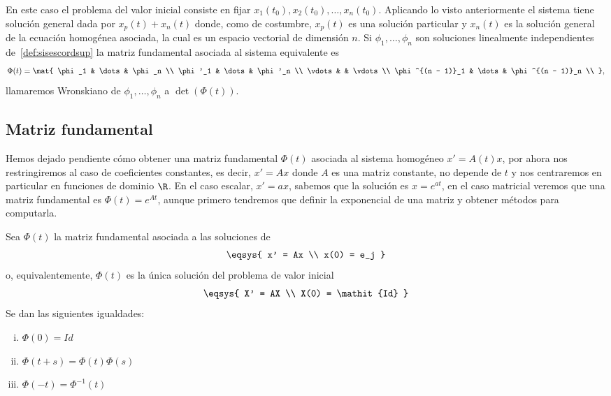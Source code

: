 \documentclass[../main.tex]{subfiles}
\begin{document}
En este caso el problema del valor inicial consiste en fijar \(x_1(t_0), 
x_2(t_0), \dots, x_n(t_0)\). Aplicando lo visto anteriormente el sistema tiene
solución general dada por \(x_p(t) + x_n(t)\) donde, como de costumbre, 
\(x_p(t)\) es una solución particular y \(x_n(t)\) es la solución general de la
ecuación homogénea asociada, la cual es un espacio vectorial de dimensión \(n\).
Si \(\phi_1, \dots, \phi_n\) son soluciones linealmente independientes 
de~\ref{def:sisescordsup} la matriz fundamental asociada al sistema equivalente
es
\[\Phi(t) = \mat{
	\phi_1 & \dots & \phi_n \\ 
	\phi'_1 & \dots & \phi'_n \\ 
	\vdots & & \vdots \\ 
	\phi^{(n - 1)}_1 & \dots & \phi^{(n - 1)}_n \\ 
	},\]
llamaremos Wronskiano de \(\phi_1, \dots, \phi_n\) a \(\det(\Phi(t))\).

\subsection{Matriz fundamental}

Hemos dejado pendiente cómo obtener una matriz fundamental \(\Phi(t)\) asociada
al sistema homogéneo \(x' = A(t)x\), por ahora nos restringiremos al caso de
coeficientes constantes, es decir, \(x' = Ax\) donde \(A\) es una matriz
constante, no depende de \(t\) y nos centraremos en particular en funciones de 
dominio \(\R\).  
En el caso escalar, \(x' = ax\), sabemos que la solución es 
\(x = e^{at}\), en el caso matricial veremos que una matriz fundamental es
\(\Phi(t) = e^{At}\), aunque primero tendremos que definir la exponencial de una
matriz y obtener métodos para computarla.

\begin{lemma}
\label{lem:expphi}
	Sea \(\Phi(t)\) la matriz fundamental asociada a las soluciones de
	\[\eqsys{
		x' = Ax \\
		x(0) = e_j
		}\]
	o, equivalentemente, \(\Phi(t)\) es la única solución del problema de valor
	inicial
	\[\eqsys{
		X' = AX \\
		X(0) = \mathit{Id}
		}\]
	Se dan las siguientes igualdades:
	\begin{multicols}{3}
	\begin{enumerate}[i)]
		\item \(\displaystyle \Phi(0) = \mathit{Id}\) 
		\item \(\displaystyle \Phi(t + s) = \Phi(t) \Phi(s)\) 
		\item \(\displaystyle \Phi(-t) = \Phi^{-1}(t)\) 
	\end{enumerate}
	\end{multicols}
\end{lemma}
\end{document}
